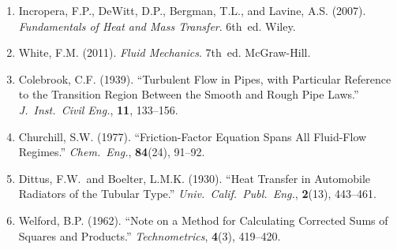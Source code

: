 \documentclass[11pt]{article}
\begin{document}
\begin{enumerate}
  \item Incropera, F.P., DeWitt, D.P., Bergman, T.L., and Lavine, A.S.
        (2007). \textit{Fundamentals of Heat and Mass Transfer}. 6th~ed.
        Wiley.

  \item White, F.M. (2011). \textit{Fluid Mechanics}. 7th~ed. McGraw-Hill.

  \item Colebrook, C.F. (1939). ``Turbulent Flow in Pipes, with Particular
        Reference to the Transition Region Between the Smooth and Rough
        Pipe Laws.'' \textit{J.\ Inst.\ Civil Eng.}, \textbf{11}, 133--156.

  \item Churchill, S.W. (1977). ``Friction-Factor Equation Spans All
        Fluid-Flow Regimes.'' \textit{Chem.\ Eng.}, \textbf{84}(24), 91--92.
        \label{churchill1977}

  \item Dittus, F.W.\ and Boelter, L.M.K. (1930). ``Heat Transfer in
        Automobile Radiators of the Tubular Type.''
        \textit{Univ.\ Calif.\ Publ.\ Eng.}, \textbf{2}(13), 443--461.

  \item Welford, B.P. (1962). ``Note on a Method for Calculating
        Corrected Sums of Squares and Products.''
        \textit{Technometrics}, \textbf{4}(3), 419--420.
\end{enumerate}
\end{document}
